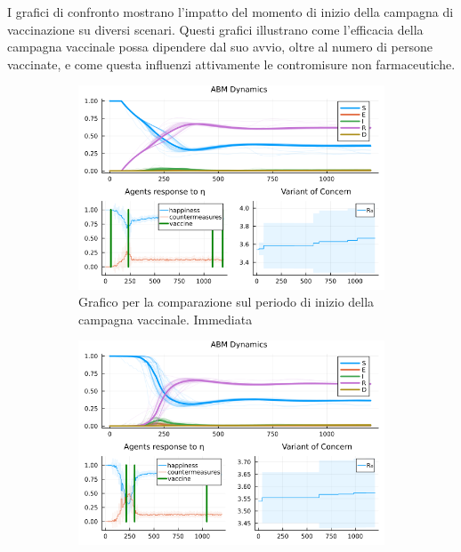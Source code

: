 I grafici di confronto mostrano l'impatto del momento di inizio della 
campagna di vaccinazione su diversi scenari. Questi grafici illustrano 
come l'efficacia della campagna vaccinale possa dipendere dal suo avvio, 
oltre al numero di persone vaccinate, e come questa influenzi attivamente
le contromisure non farmaceutiche.

\begin{figure}[H]
	\centering
	\begin{subfigure}[b]{0.45\textwidth}
		\centering
		\includegraphics[width=\textwidth]{img/SocialNetworkABM_2_A.png}
		\caption{Grafico per la comparazione sul periodo di inizio della campagna vaccinale. Immediata}
		\label{fig:comparison_all_1}
	\end{subfigure}
	\hfill
	\begin{subfigure}[b]{0.45\textwidth}
		\centering
		\includegraphics[width=\textwidth]{img/SocialNetworkABM_4_A.png}

\end{subfigure}
\end{figure}
